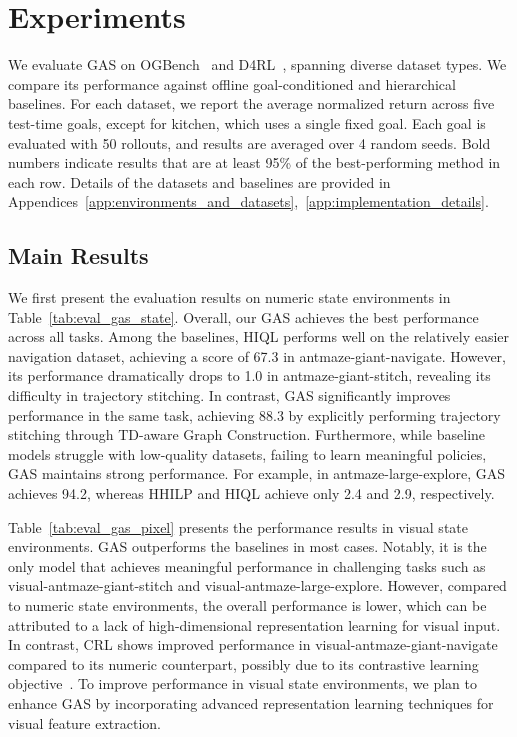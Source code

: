 \documentclass{article}
\begin{document}
\section{Experiments}
We evaluate GAS on OGBench~\cite{park2025ogbench} and D4RL~\cite{fu2020d4rl}, spanning diverse dataset types. We compare its performance against offline goal-conditioned and hierarchical baselines. For each dataset, we report the average normalized return across five test-time goals, except for kitchen, which uses a single fixed goal. Each goal is evaluated with 50 rollouts, and results are averaged over 4 random seeds. Bold numbers indicate results that are at least 95\% of the best-performing method in each row. Details of the datasets and baselines are provided in Appendices~\ref{app:environments_and_datasets},~\ref{app:implementation_details}.

\subsection{Main Results} 
We first present the evaluation results on numeric state environments in Table~\ref{tab:eval_gas_state}. Overall, our GAS achieves the best performance across all tasks. Among the baselines, HIQL performs well on the relatively easier navigation dataset, achieving a score of 67.3 in antmaze-giant-navigate. However, its performance dramatically drops to 1.0 in antmaze-giant-stitch, revealing its difficulty in trajectory stitching. In contrast, GAS significantly improves performance in the same task, achieving 88.3 by explicitly performing trajectory stitching through TD-aware Graph Construction. Furthermore, while baseline models struggle with low-quality datasets, failing to learn meaningful policies, GAS maintains strong performance. For example, in antmaze-large-explore, GAS achieves 94.2, whereas HHILP and HIQL achieve only 2.4 and 2.9, respectively.

Table~\ref{tab:eval_gas_pixel} presents the performance results in visual state environments. GAS outperforms the baselines in most cases. Notably, it is the only model that achieves meaningful performance in challenging tasks such as visual-antmaze-giant-stitch and visual-antmaze-large-explore. However, compared to numeric state environments, the overall performance is lower, which can be attributed to a lack of high-dimensional representation learning for visual input. In contrast, CRL shows improved performance in visual-antmaze-giant-navigate compared to its numeric counterpart, possibly due to its contrastive learning objective~\cite{eysenbach2022contrastive, zheng2024stabilizing}. To improve performance in visual state environments, we plan to enhance GAS by incorporating advanced representation learning techniques for visual feature extraction.
\end{document}
